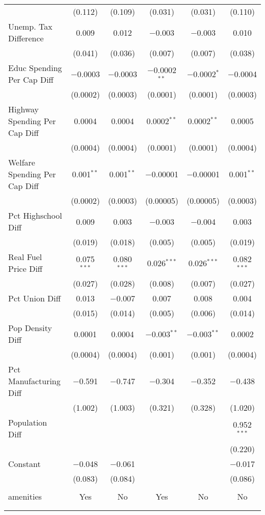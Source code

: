 \begin{table}[!htbp]
\begin{tabular}{@{\extracolsep{5pt}}lccccc}
  & (0.112) & (0.109) & (0.031) & (0.031) & (0.110) \\ 
  Unemp. Tax Difference & 0.009 & 0.012 & $-$0.003 & $-$0.003 & 0.010 \\ 
  & (0.041) & (0.036) & (0.007) & (0.007) & (0.038) \\ 
  Educ Spending Per Cap Diff & $-$0.0003 & $-$0.0003 & $-$0.0002$^{**}$ & $-$0.0002$^{*}$ & $-$0.0004 \\ 
  & (0.0002) & (0.0003) & (0.0001) & (0.0001) & (0.0003) \\ 
  Highway Spending Per Cap Diff & 0.0004 & 0.0004 & 0.0002$^{**}$ & 0.0002$^{**}$ & 0.0005 \\ 
  & (0.0004) & (0.0004) & (0.0001) & (0.0001) & (0.0004) \\ 
  Welfare Spending Per Cap Diff & 0.001$^{**}$ & 0.001$^{**}$ & $-$0.00001 & $-$0.00001 & 0.001$^{**}$ \\ 
  & (0.0002) & (0.0003) & (0.00005) & (0.00005) & (0.0003) \\ 
  Pct Highschool Diff & 0.009 & 0.003 & $-$0.003 & $-$0.004 & 0.003 \\ 
  & (0.019) & (0.018) & (0.005) & (0.005) & (0.019) \\ 
  Real Fuel Price Diff & 0.075$^{***}$ & 0.080$^{***}$ & 0.026$^{***}$ & 0.026$^{***}$ & 0.082$^{***}$ \\ 
  & (0.027) & (0.028) & (0.008) & (0.007) & (0.027) \\ 
  Pct Union Diff & 0.013 & $-$0.007 & 0.007 & 0.008 & 0.004 \\ 
  & (0.015) & (0.014) & (0.005) & (0.006) & (0.014) \\ 
  Pop Density Diff & 0.0001 & 0.0004 & $-$0.003$^{**}$ & $-$0.003$^{**}$ & 0.0002 \\ 
  & (0.0004) & (0.0004) & (0.001) & (0.001) & (0.0004) \\ 
  Pct Manufacturing Diff & $-$0.591 & $-$0.747 & $-$0.304 & $-$0.352 & $-$0.438 \\ 
  & (1.002) & (1.003) & (0.321) & (0.328) & (1.020) \\ 
  Population Diff &  &  &  &  & 0.952$^{***}$ \\ 
  &  &  &  &  & (0.220) \\ 
  Constant & $-$0.048 & $-$0.061 &  &  & $-$0.017 \\ 
  & (0.083) & (0.084) &  &  & (0.086) \\ 
 \hline \\[-1.8ex] 
amenities & Yes & No & Yes & No & No \\ 
\hline \\[-1.8ex] 
\hline 
\hline \\[-1.8ex] 
\end{tabular} 
\end{table} 
